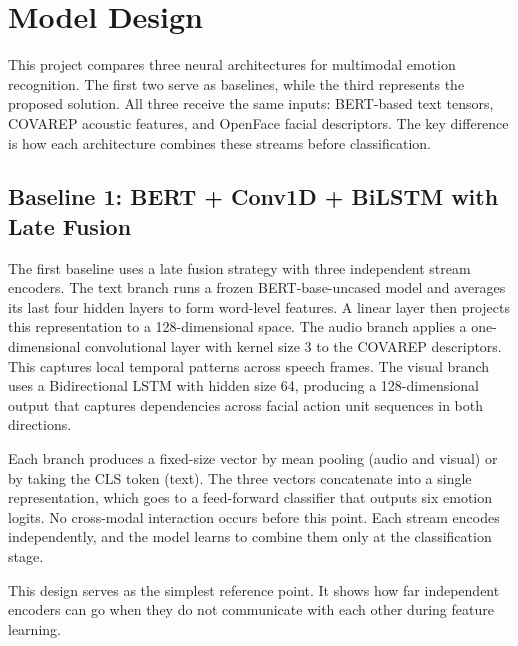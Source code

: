 

\section{Model Design}

\label{sec:model_design}

This project compares three neural architectures for multimodal emotion recognition. The first two serve as baselines, while the third represents the proposed solution. All three receive the same inputs: BERT-based text tensors, COVAREP acoustic features, and OpenFace facial descriptors. The key difference is how each architecture combines these streams before classification.


\subsection{Baseline 1: BERT + Conv1D + BiLSTM with Late Fusion}

\label{subsec:baseline1}

The first baseline uses a late fusion strategy with three independent stream encoders. The text branch runs a frozen BERT-base-uncased model and averages its last four hidden layers to form word-level features. A linear layer then projects this representation to a 128-dimensional space. The audio branch applies a one-dimensional convolutional layer with kernel size 3 to the COVAREP descriptors. This captures local temporal patterns across speech frames. The visual branch uses a Bidirectional LSTM with hidden size 64, producing a 128-dimensional output that captures dependencies across facial action unit sequences in both directions.

Each branch produces a fixed-size vector by mean pooling (audio and visual) or by taking the CLS token (text). The three vectors concatenate into a single representation, which goes to a feed-forward classifier that outputs six emotion logits. No cross-modal interaction occurs before this point. Each stream encodes independently, and the model learns to combine them only at the classification stage.

This design serves as the simplest reference point. It shows how far independent encoders can go when they do not communicate with each other during feature learning.



